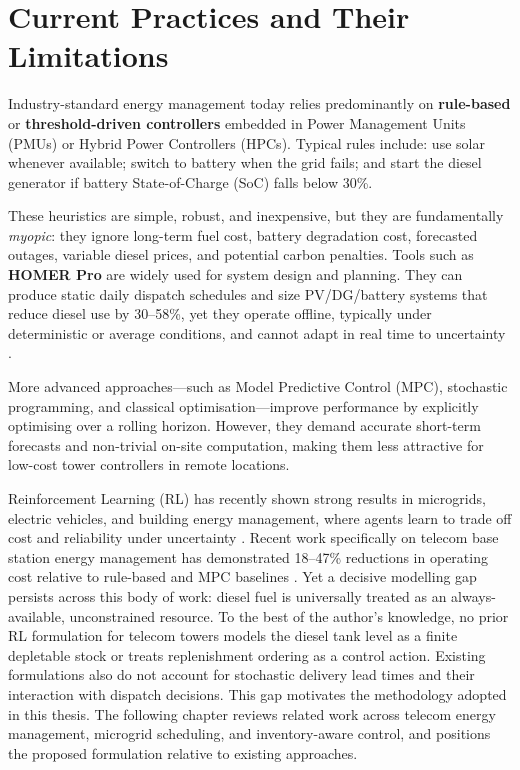 \section{Current Practices and Their Limitations}

Industry-standard energy management today relies predominantly on
\textbf{rule-based} or \textbf{threshold-driven controllers} embedded in
Power Management Units (PMUs) or Hybrid Power Controllers (HPCs). Typical
rules include: use solar whenever available; switch to battery when the grid
fails; and start the diesel generator if battery State-of-Charge (SoC) falls
below 30\%.

These heuristics are simple, robust, and inexpensive, but they are
fundamentally \emph{myopic}: they ignore long-term fuel cost, battery
degradation cost, forecasted outages, variable diesel prices, and potential
carbon penalties. Tools such as \textbf{HOMER Pro} are widely used for system
design and planning. They can produce static daily dispatch schedules and size
PV/DG/battery systems that reduce diesel use by 30--58\%, yet they operate
offline, typically under deterministic or average conditions, and cannot adapt
in real time to uncertainty \citep{homer_energy_2020,meena2020_homer_telecom}.

More advanced approaches---such as Model Predictive Control (MPC), stochastic
programming, and classical optimisation---improve performance by explicitly
optimising over a rolling horizon. However, they demand accurate short-term
forecasts and non-trivial on-site computation, making them less attractive for
low-cost tower controllers in remote locations.

Reinforcement Learning (RL) has recently shown strong results in microgrids,
electric vehicles, and building energy management, where agents learn to trade
off cost and reliability under uncertainty
\citep{mao2021_inventory_rl,lin_ev_rl_2024,wang2022_building_rl}. Recent
work specifically on telecom base station energy management has demonstrated
18--47\% reductions in operating cost relative to rule-based and MPC baselines
\citep{ma_pan_2025_telecom_ies,yan_2025_safe_marl_bs,alhajhassan_2024_battery_ageing_rl}.
Yet a decisive modelling gap persists across this body of work: diesel fuel is
universally treated as an always-available, unconstrained resource. To the best
of the author's knowledge, no prior RL formulation for telecom towers models
the diesel tank level as a finite depletable stock or treats replenishment
ordering as a control action. Existing formulations also do not account for
stochastic delivery lead times and their interaction with dispatch decisions.
This gap motivates the
methodology adopted in this thesis. The following chapter reviews related
work across telecom energy management, microgrid scheduling, and
inventory-aware control, and positions the proposed formulation relative
to existing approaches.


